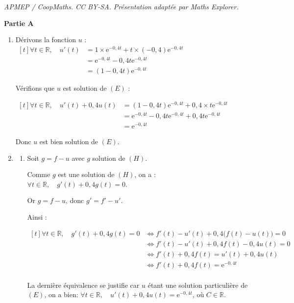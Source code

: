 \documentclass[10pt]{article}
\providecommand{\R}{\mathbb{R}}
\providecommand{\e}{{\mathrm{e}}}
\begin{document}
\noindent\textit{APMEP / CoopMaths. CC BY-SA. Présentation adaptée par Maths Explorer.}\par\medskip
\medskip

\textbf{Partie A}

	\medskip

\begin{enumerate}
\item Dérivons la fonction $u$ :
\quad
$\begin{aligned}[t]
\forall t \in \R,\quad u'(t) &= 1 \times \e^{-0,4t} + t \times (-0,4)\e^{-0,4t} \\
&= \e^{-0,4t} - 0,4t\e^{-0,4t} \\
&= (1 - 0,4t)\e^{-0,4t}
\end{aligned}$

Vérifions que $u$ est solution de $(E)$ :

$\begin{aligned}[t] \forall t \in \R, \quad
u'(t) + 0,4u(t) &= (1 - 0,4t)\e^{-0,4t} + 0,4 \times t\e^{-0,4t}\\
&= \e^{-0,4t} - 0,4t\e^{-0,4t} + 0,4t\e^{-0,4t}\\
&= \e^{-0,4t}
\end{aligned}$

Donc $u$ est bien solution de $(E)$.

\item
	\begin{enumerate}
		\item Soit $g = f - u$ avec $g$ solution de $(H)$.

Comme $g$ est une solution de $(H)$, on a :\quad $\forall t \in \R, \quad g'(t) + 0,4g(t) = 0$.

Or $g = f - u$, donc $g' = f' - u'$.

Ainsi :

$\begin{aligned}[t]
\forall t \in \R, \quad g'(t) +0,4g(t) = 0
	&\iff f'(t) - u'(t) + 0,4\big(f(t) - u(t)\big) = 0 \\
	&\iff f'(t) - u'(t) + 0,4f(t) - 0,4u(t) = 0\\
	&\iff f'(t) + 0,4f(t) = u'(t)  + 0,4u(t)\\
	&\iff f'(t) + 0,4f(t) = \e^{-0,4t}\\
\end{aligned}$

La dernière équivalence se justifie car $u$ étant une solution particulière de $(E)$, on a bien:
\quad $\forall t \in \R, \quad u'(t) + 0,4u(t) = \e^{-0,4t}$, \quad où $C \in \R$.


\end{enumerate}
\end{enumerate}
\end{document}

